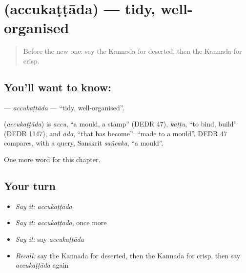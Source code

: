 \section[\texorpdfstring{\kn{ಅಚ್ಚುಕಟ್ಟಾದ} (accukaṭṭāda)}{ಅಚ್ಚುಕಟ್ಟಾದ (accukaṭṭāda)}]{ (accukaṭṭāda) — tidy, well-organised}

\label{lesson:KA-C292-accukattada}



\begin{quote}
Before the new one: say the Kannada for deserted, then the Kannada for crisp.
\end{quote}

\subsection*{You'll want to know: }
\textbf{} — \emph{accukaṭṭāda} — \textquotedblleft{}tidy, well-organised\textquotedblright{}.

\begin{cousinweb}
\textbf{} (\emph{accukaṭṭāda}) is \emph{accu}, \textquotedblleft{}a mould, a stamp\textquotedblright{} (DEDR 47), \emph{kaṭṭu}, \textquotedblleft{}to bind, build\textquotedblright{} (DEDR 1147), and \emph{āda}, \textquotedblleft{}that has become\textquotedblright{}: \textquotedblleft{}made to a mould\textquotedblright{}. DEDR 47 compares, with a query, Sanskrit \emph{sañcaka}, \textquotedblleft{}a mould\textquotedblright{}.
\end{cousinweb}

\begin{grammarlens}[title={What you've built}]
One more word for this chapter.
\end{grammarlens}

\subsection*{Your turn}
\begin{itemize}
\raggedright
  \item \emph{Say it:} \emph{accukaṭṭāda}
  \item \emph{Say it:} \emph{accukaṭṭāda}, once more
  \item \emph{Say it:} say \emph{accukaṭṭāda}
  \item \emph{Recall:} say the Kannada for deserted, then the Kannada for crisp, then say \emph{accukaṭṭāda} again
\end{itemize}

